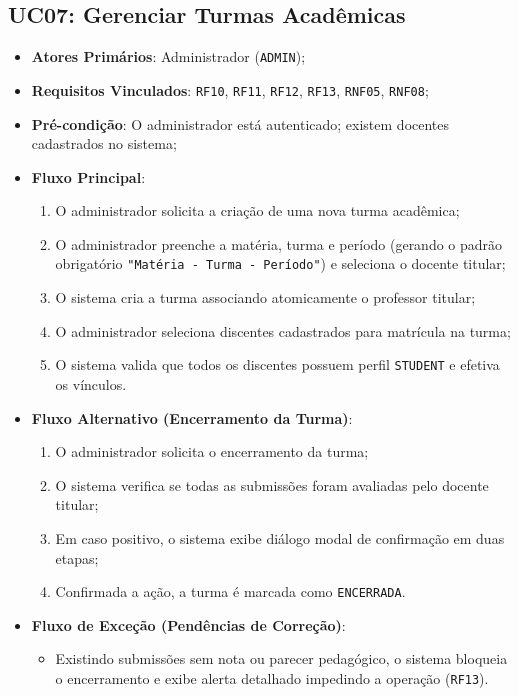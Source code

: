 \subsection{UC07: Gerenciar Turmas Acadêmicas}
\label{sub_uc07}
\begin{itemize}
    \item \textbf{Atores Primários}: Administrador (\texttt{ADMIN});
    \item \textbf{Requisitos Vinculados}: \texttt{RF10}, \texttt{RF11}, \texttt{RF12}, \texttt{RF13}, \texttt{RNF05}, \texttt{RNF08};
    \item \textbf{Pré-condição}: O administrador está autenticado; existem docentes cadastrados no sistema;
    \item \textbf{Fluxo Principal}:
    \begin{enumerate}
        \item O administrador solicita a criação de uma nova turma acadêmica;
        \item O administrador preenche a matéria, turma e período (gerando o padrão obrigatório \texttt{"Matéria - Turma - Período"}) e seleciona o docente titular;
        \item O sistema cria a turma associando atomicamente o professor titular;
        \item O administrador seleciona discentes cadastrados para matrícula na turma;
        \item O sistema valida que todos os discentes possuem perfil \texttt{STUDENT} e efetiva os vínculos.
    \end{enumerate}
    \item \textbf{Fluxo Alternativo (Encerramento da Turma)}:
    \begin{enumerate}
        \item O administrador solicita o encerramento da turma;
        \item O sistema verifica se todas as submissões foram avaliadas pelo docente titular;
        \item Em caso positivo, o sistema exibe diálogo modal de confirmação em duas etapas;
        \item Confirmada a ação, a turma é marcada como \texttt{ENCERRADA}.
    \end{enumerate}
    \item \textbf{Fluxo de Exceção (Pendências de Correção)}:
    \begin{itemize}
        \item Existindo submissões sem nota ou parecer pedagógico, o sistema bloqueia o encerramento e exibe alerta detalhado impedindo a operação (\texttt{RF13}).
    \end{itemize}
\end{itemize}

